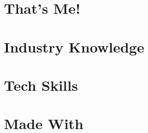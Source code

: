 \documentclass[a4paper,landscape]{deedy-resume} %
\begin{document}
\begin{minipage}[t]{0.33\textwidth} %


\section{That's Me!} 


\sectionspace %


\section{Industry Knowledge} 


\sectionspace %



\end{minipage} %
\hfill
%
%
\begin{minipage}[t]{0.33\textwidth} %


\section{Tech Skills}


\sectionspace %


\vspace{5mm}
\section{Made With}
\sectionspace %


\end{minipage} %
\end{document}
